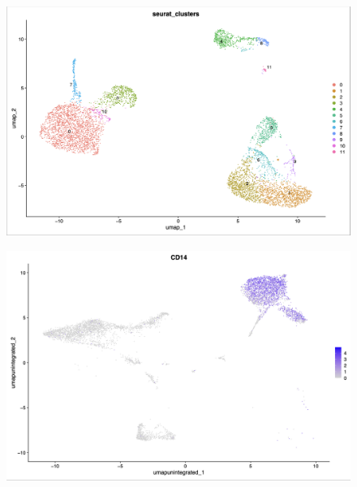 \documentclass{article}
\begin{document}
\begin{figure}[h!]
    \centering
    \begin{minipage}[b]{0.45\textwidth} %
        \centering
        \includegraphics[width=\textwidth,height=0.25\textheight,keepaspectratio]{figures/Figure1A.png} %
        \subcaption{}
        \label{fig:figure1A}
    \end{minipage}
    \hfill
    \begin{minipage}[b]{0.45\textwidth} %
        \centering
        \includegraphics[width=\textwidth,height=0.25\textheight,keepaspectratio]{figures/Figure1B.png} %
        \subcaption{}
        \label{fig:figure1B}
    \end{minipage}
    

\end{figure}
\end{document}
